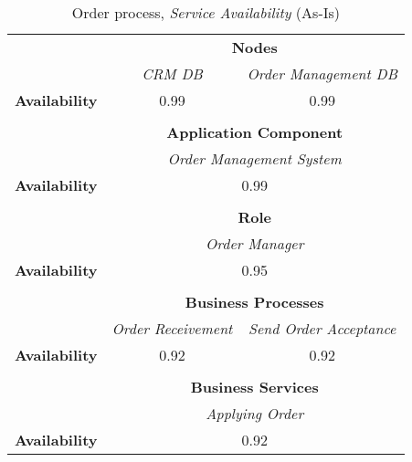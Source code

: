 \begin{table}[H]
	\centering
	\begin{tabular}{|c|c|p{2cm}|p{2.5cm}|p{2.5cm}|p{2.5cm}|}
		\cline{3-6}

		\multicolumn{2}{c}{} & \multicolumn{4}{|c|}{\textbf{Nodes}} \\ \cline{3-6}
		\multicolumn{2}{c|}{}  & \multicolumn{2}{c|}{\textsl{CRM DB}} & \multicolumn{2}{c|}{\textsl{Order Management DB}} \\
		\hline
		\multicolumn{2}{|c|}{\textbf{Availability}} & \multicolumn{2}{c|}{0.99} & \multicolumn{2}{c|}{0.99} \\ \hline
		
		\multicolumn{6}{c}{} \\ \cline{3-6}
		\multicolumn{2}{c}{} & \multicolumn{4}{|c|}{\textbf{Application Component}} \\ \cline{3-6}
		\multicolumn{2}{c|}{} & \multicolumn{4}{c|}{\textsl{Order Management System}} \\
		\hline
		\multicolumn{2}{|c|}{\textbf{Availability}} & \multicolumn{4}{c|}{0.99} \\ \hline
		
		\multicolumn{6}{c}{} \\ \cline{3-6}
		\multicolumn{2}{c}{} & \multicolumn{4}{|c|}{\textbf{Role}} \\ \cline{3-6}
		\multicolumn{2}{c|}{} & \multicolumn{4}{c|}{\textsl{Order Manager}} \\
		\hline
		\multicolumn{2}{|c|}{\textbf{Availability}}  & \multicolumn{4}{c|}{0.95}  \\ \hline

		\multicolumn{6}{c}{} \\ \cline{3-6}
		\multicolumn{2}{c}{} & \multicolumn{4}{|c|}{\textbf{Business Processes}} \\ \cline{3-6}
		\multicolumn{2}{c|}{} & \multicolumn{2}{c|}{\textsl{Order Receivement}} & \multicolumn{2}{c|}{\textsl{Send Order Acceptance}} \\
		\hline
		\multicolumn{2}{|c|}{\textbf{Availability}} & \multicolumn{2}{c|}{0.92} & \multicolumn{2}{c|}{0.92} \\ \hline

		\multicolumn{6}{c}{} \\ \cline{3-6}
		\multicolumn{2}{c}{} & \multicolumn{4}{|c|}{\textbf{Business Services}} \\ \cline{3-6}
		\multicolumn{2}{c|}{} &  \multicolumn{4}{c|}{\textsl{Applying Order}}  \\
		\hline
		\multicolumn{2}{|c|}{\textbf{Availability}}  & \multicolumn{4}{c|}{0.92}\\ \hline

	\end{tabular}
\caption{Order process, \textsl{Service Availability} (As-Is)} 
\label{tab:order_availability_as_is}
\end{table}